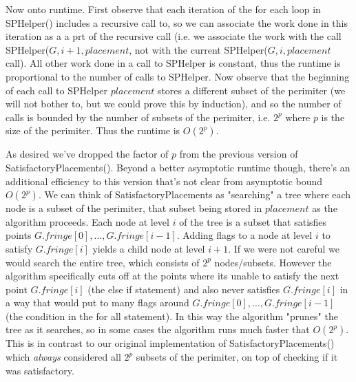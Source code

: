 \documentclass{article}
\theoremstyle{definition}
\theoremstyle{definition}
\theoremstyle{theorem}
\begin{document}
	Now onto runtime. First observe that each iteration of the for each loop in SPHelper() includes a recursive call to, so we can associate the work done in this iteration as a a prt of the recursive call (i.e. we associate the work with the call SPHelper($G, i+1, placement$, not with the current SPHelper($G, i, placement$ call). All other work done in a call to SPHelper is constant, thus the runtime is proportional to the number of calls to SPHelper. Now observe that the beginning of each call to SPHelper $placement$ stores a different subset of the perimiter (we will not bother to, but we could prove this by induction), and so the number of calls is bounded by the number of subsets of the perimiter, i.e. $2^p$ where $p$ is the size of the perimiter. Thus the runtime is $O(2^p)$.
	
	As desired we've dropped the factor of $p$ from the previous version of SatisfactoryPlacements(). Beyond a better asymptotic runtime though, there's an additional efficiency to this version that's not clear from asymptotic bound $O(2^p)$.  We can think of SatisfactoryPlacements as "searching" a tree where each node is a subset of the perimiter, that subset being stored in $placement$ as the algorithm proceeds. Each node at level $i$ of the tree is a subset that satisfies points $G.fringe[0],...,G.fringe[i-1]$. Adding flags to a node at level $i$ to satisfy $G.fringe[i]$ yields a child node at level $i + 1$. If we were not careful we would search the entire tree, which consists of $2^p$ nodes/subsets. However the algorithm specifically cuts off at the points where its unable to satisfy the next point $G.fringe[i]$ (the else if statement) and also never satisfies $G.fringe[i]$ in a way that would put to many flags around $G.fringe[0],...,G.fringe[i-1]$ (the condition in the for all statement). In this way the algorithm "prunes" the tree as it searches, so in some cases the algorithm runs much faster that $O(2^p)$. This is in contrast to our original implementation of SatisfactoryPlacements() which \textit{always} considered all $2^p$ subsets of the perimiter, on top of checking if it was satisfactory.
	
	
	
	
	
\end{document}
